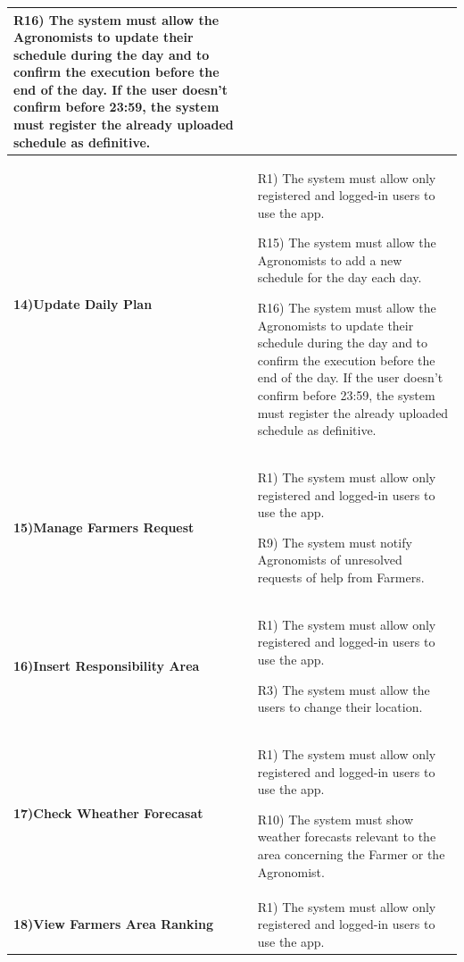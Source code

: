 \documentclass[table, 12pt]{article}
\begin{document}
\begin{itemize}
\begin{longtable}{|p{}|p{}|}
                                                                                          R16) The system must allow the Agronomists to update their schedule during the day and to confirm the execution before the end of the day. If the user doesn't confirm before 23:59, the system must register the already uploaded schedule as definitive.\\\hline
                    \cellcolor{SpringGreen!50}\textbf{14)Update Daily Plan}\centering &  R1) The system must allow only registered and logged-in users to use the app.
                    
                                                                                         R15) The system must allow the Agronomists to add a new schedule for the day each day.
                                                                                        
                                                                                         R16) The system must allow the Agronomists to update their schedule during the day and to confirm the execution before the end of the day. If the user doesn't confirm before 23:59, the system must register the already uploaded schedule as definitive.\\\hline
                    
                    \cellcolor{SpringGreen!50}\textbf{15)Manage Farmers Request}\centering &  R1) The system must allow only registered and logged-in users to use the app.
                    
                                                                                    R9) The system must notify Agronomists of unresolved requests of help from Farmers.\\\hline
                    \cellcolor{SpringGreen!50}\textbf{16)Insert Responsibility Area}\centering &  R1) The system must allow only registered and logged-in users to use the app.
                    
                                                                                        R3) The system must allow the users to change their location.\\\hline
                    \cellcolor{SpringGreen!50}\textbf{17)Check Wheather Forecasat}\centering & R1) The system must allow only registered and logged-in users to use the app.
                    
                                                                                     R10) The system must show weather forecasts relevant to the area concerning the Farmer or the Agronomist.\\\hline
                    \cellcolor{SpringGreen!50}\textbf{18)View Farmers Area Ranking}\centering&  R1) The system must allow only registered and logged-in users to use the app.


\end{longtable}
\end{itemize}
\end{document}

